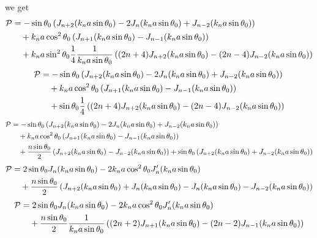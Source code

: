 we get
\begin{align}
    {\cal P} & =-\sin\theta_0\left(J_{n+2}(k_na\sin\theta_0)-2J_n(k_na\sin\theta_0)+J_{n-2}(k_na\sin\theta_0)\right) \nonumber                       \\
             & \quad +{k_na}\cos^2\theta_0\left(J_{n+1}(k_na\sin\theta_0)-J_{n-1}(k_na\sin\theta_0)\right)\nonumber                                  \\
             & \quad+k_na\sin^2\theta_0\frac1{4}\frac1{k_na\sin\theta_0}\left((2n+4)J_{n+2}(k_na\sin\theta_0)-(2n-4)J_{n-2}(k_na\sin\theta_0)\right)
\end{align}
\begin{align}
    {\cal P} & =-\sin\theta_0\left(J_{n+2}(k_na\sin\theta_0)-2J_n(k_na\sin\theta_0)+J_{n-2}(k_na\sin\theta_0)\right) \nonumber \\
             & \quad +{k_na}\cos^2\theta_0\left(J_{n+1}(k_na\sin\theta_0)-J_{n-1}(k_na\sin\theta_0)\right)\nonumber            \\
             & \quad+\sin\theta_0\frac1{4}\left((2n+4)J_{n+2}(k_na\sin\theta_0)-(2n-4)J_{n-2}(k_na\sin\theta_0)\right)
\end{align}
\begin{align}
    {\cal P} & =-\sin\theta_0\left(J_{n+2}(k_na\sin\theta_0)-2J_n(k_na\sin\theta_0)+J_{n-2}(k_na\sin\theta_0)\right) \nonumber                                                            \\
             & \quad +{k_na}\cos^2\theta_0\left(J_{n+1}(k_na\sin\theta_0)-J_{n-1}(k_na\sin\theta_0)\right)\nonumber                                                                       \\
             & \quad+\frac{n\sin\theta_0}{2}\left(J_{n+2}(k_na\sin\theta_0)-J_{n-2}(k_na\sin\theta_0)\right)+\sin\theta_0\left(J_{n+2}(k_na\sin\theta_0)+J_{n-2}(k_na\sin\theta_0)\right)
\end{align}
\begin{align}
    {\cal P} & =2\sin\theta_0J_n(k_na\sin\theta_0) -2{k_na}\cos^2\theta_0J'_{n}(k_na\sin\theta_0)\nonumber                                               \\
             & \quad+\frac{n\sin\theta_0}{2}\left(J_{n+2}(k_na\sin\theta_0)+J_n(k_na\sin\theta_0)-J_n(k_na\sin\theta_0)-J_{n-2}(k_na\sin\theta_0)\right)
\end{align}
\begin{align}
    {\cal P} & =2\sin\theta_0J_n(k_na\sin\theta_0) -2{k_na}\cos^2\theta_0J'_{n}(k_na\sin\theta_0)\nonumber                                         \\
             & \quad+\frac{n\sin\theta_0}{2}\frac{1}{k_na\sin\theta_0}\left((2n+2)J_{n+1}(k_na\sin\theta_0)-(2n-2)J_{n-1}(k_na\sin\theta_0)\right)
\end{align}

